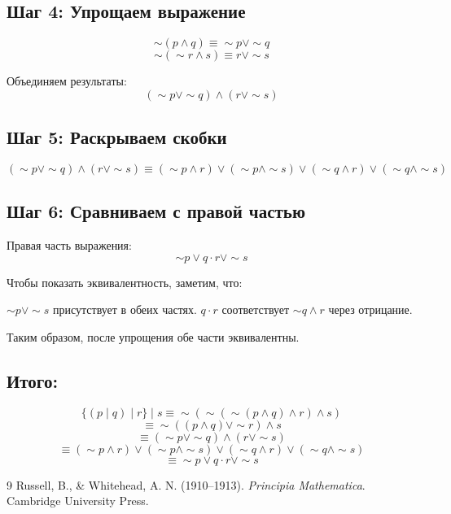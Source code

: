 \documentclass[a4paper, 12pt]{article}
\begin{document}
\subsection*{Шаг 4: Упрощаем выражение}
\[\sim (p \wedge q) \equiv \sim p \vee \sim q\]
\[\sim (\sim r \wedge s) \equiv r \vee \sim s\]

Объединяем результаты:
\[(\sim p \vee \sim q) \wedge (r \vee \sim s)\]

\subsection*{Шаг 5: Раскрываем скобки}
\[(\sim p \vee \sim q) \wedge (r \vee \sim s) \equiv (\sim p \wedge r) \vee (\sim p \wedge \sim s) \vee (\sim q \wedge r) \vee (\sim q \wedge \sim s)\]

\subsection*{Шаг 6: Сравниваем с правой частью}
Правая часть выражения:
\[ \sim p \vee q \cdot r \vee \sim s\]

Чтобы показать эквивалентность, заметим, что:

$\sim p \vee \sim s$ присутствует в обеих частях.
$q \cdot r$ соответствует $\sim q \wedge r$ через отрицание.

Таким образом, после упрощения обе части эквивалентны.
\subsection*{Итого:}
\[ \lbrace (p \mid q) \mid r \rbrace \mid s \equiv \sim \left( \sim \left( \sim (p \wedge q) \wedge r \right) \wedge s \right) \]
\[\equiv \sim \left( (p \wedge q) \vee \sim r \right) \wedge s \]
\[\equiv (\sim p \vee \sim q) \wedge (r \vee \sim s) \]
\[\equiv (\sim p \wedge r) \vee (\sim p \wedge \sim s) \vee (\sim q \wedge r) \vee (\sim q \wedge \sim s) \]
\[\equiv \sim p \vee q \cdot r \vee \sim s\]

\begin{thebibliography}{9}
    Russell, B., \& Whitehead, A. N. (1910--1913).
    \textit{Principia Mathematica}.
    Cambridge University Press.
\end{thebibliography}
\end{document}
